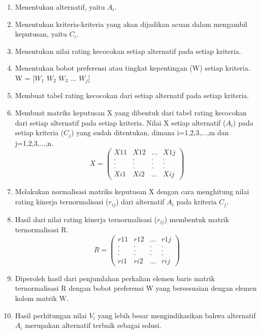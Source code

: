 \documentclass[a4paper,twoside]{article}
\begin{document}
\begin{enumerate}
	\begin{enumerate}
		\item Menentukan alternatif, yaitu $A_{i}$.
		\item Menentukan kriteria-kriteria yang akan dijadikan acuan dalam mengambil keputusan, yaitu $C_{i}$.
		\item Menentukan nilai rating kecocokan setiap alternatif pada setiap kriteria.
		\item Menentukan bobot preferensi atau tingkat kepentingan (W) setiap kriteria. W = [$W_{1}$ $W_{2}$ $W_{3}$ ... $W_{j}$]
		\item Membuat tabel rating kecocokan dari setiap alternatif pada setiap kriteria.
		\item Membuat matriks keputusan X yang dibentuk dari tabel rating kecocokan dari setiap alternatif pada setiap kriteria. Nilai X setiap alternatif ($A_{i}$) pada setiap kriteria ($C_{j}$) yang sudah ditentukan, dimana i=1,2,3,...,m dan j=1,2,3,...,n.
		 \begin{displaymath} X = 
\left (
\begin{array}{rrrr}
X11 & X12 &... &X1j\\		
. & . & . & .\\
. & . & . & .\\
. & . & . & .\\
			Xi1 & Xi2 &... &Xij\end{array}
\right )	
	\end{displaymath}
	\item Melakukan normalisasi matriks keputusan X dengan cara menghitung nilai rating kinerja ternormalisasi ($r_{ij}$) dari alternatif $A_{i}$ pada kriteria $C_{j}$.
	\item Hasil dari nilai rating kinerja ternormalisasi ($r_{ij}$) membentuk matrik ternormalisasi R.\\
	\begin{displaymath} R = 
\left (
\begin{array}{rrrr}
r11 & r12 &... &r1j\\		
. & . & . & .\\
. & . & . & .\\
. & . & . & .\\
			ri1& ri2&... &rij\end{array}\right )	
	\end{displaymath}
	\item Diperoleh hasil dari penjumlahan perkalian elemen baris matrik ternormalisasi R dengan bobot preferensi W yang bersesuaian dengan elemen kolom matrik W. 
	\item Hasil perhitungan nilai $V_{i}$ yang lebih besar mengindikasikan bahwa alternatif $A_{i}$ merupakan alternatif terbaik sebagai solusi.
	\end{enumerate}
	

\end{enumerate}
\end{document}
